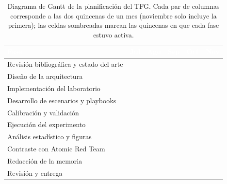 \documentclass[../main.tex]{subfiles}
\begin{document}
\begin{table}[!h]
  \centering
  \small
  \setlength{\tabcolsep}{3.5pt}
  \renewcommand{\arraystretch}{1.25}
  \begin{tabular}{|>{\raggedright\arraybackslash}p{5.1cm}|*{9}{c|}}
    \hline
    \cellcolor{tabla-cabecera}\textcolor{white}{\textbf{Fase}} &
    \multicolumn{2}{c|}{\cellcolor{tabla-cabecera}\textcolor{white}{\textbf{Jul}}} &
    \multicolumn{2}{c|}{\cellcolor{tabla-cabecera}\textcolor{white}{\textbf{Ago}}} &
    \multicolumn{2}{c|}{\cellcolor{tabla-cabecera}\textcolor{white}{\textbf{Sep}}} &
    \multicolumn{2}{c|}{\cellcolor{tabla-cabecera}\textcolor{white}{\textbf{Oct}}} &
    \multicolumn{1}{c|}{\cellcolor{tabla-cabecera}\textcolor{white}{\textbf{Nov}}} \\
    \hline
    Revisión bibliográfica y estado del arte & \cellcolor{uned-azul}&\cellcolor{uned-azul}& & & & & & & \\ \hline
    Diseño de la arquitectura                & &\cellcolor{uned-azul}&\cellcolor{uned-azul}& & & & & & \\ \hline
    Implementación del laboratorio           & & &\cellcolor{uned-azul}&\cellcolor{uned-azul}&\cellcolor{uned-azul}& & & & \\ \hline
    Desarrollo de escenarios y playbooks     & & & &\cellcolor{uned-azul}&\cellcolor{uned-azul}& & & & \\ \hline
    Calibración y validación                 & & & & &\cellcolor{uned-azul}&\cellcolor{uned-azul}& & & \\ \hline
    Ejecución del experimento                & & & & & &\cellcolor{uned-azul}& & & \\ \hline
    Análisis estadístico y figuras           & & & & & &\cellcolor{uned-azul}&\cellcolor{uned-azul}& & \\ \hline
    Contraste con Atomic Red Team            & & & & & & &\cellcolor{uned-azul}& & \\ \hline
    Redacción de la memoria                  & & & & & & &\cellcolor{uned-azul}&\cellcolor{uned-azul}&\cellcolor{uned-azul}\\ \hline
    Revisión y entrega                       & & & & & & & & &\cellcolor{uned-azul}\\ \hline
  \end{tabular}
  \caption[Diagrama de Gantt de la planificación del TFG.]
          {Diagrama de Gantt de la planificación del TFG. Cada par de
           columnas corresponde a las dos quincenas de un mes (noviembre solo
           incluye la primera); las celdas sombreadas marcan las quincenas en
           que cada fase estuvo activa.}
  \label{tab:gantt}
\end{table}
\end{document}
